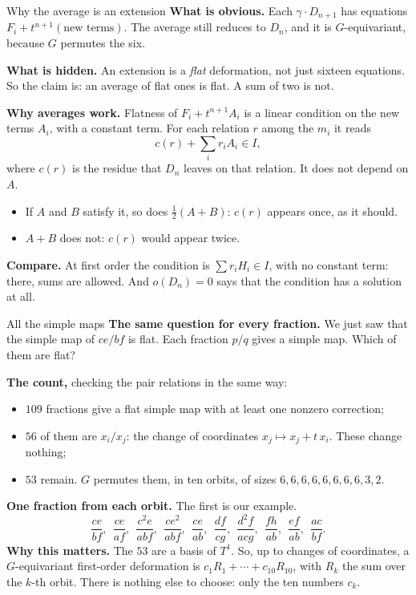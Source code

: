 \begin{frame}{Why the average is an extension}
\small
\textbf{What is obvious.} Each \(\gamma\cdot D_{n+1}\) has equations \(F_i+t^{n+1}(\text{new terms})\). The average still reduces to \(D_n\), and it is \(G\)-equivariant, because \(G\) permutes the six.
\par
\textbf{What is hidden.} An extension is a \emph{flat} deformation, not just sixteen equations. So the claim is: an average of flat ones is flat. A sum of two is not.
\par
\textbf{Why averages work.} Flatness of \(F_i+t^{n+1}A_i\) is a linear condition on the new terms \(A_i\), with a constant term. For each relation \(r\) among the \(m_i\) it reads
\[
\boxed{c(r)+\sum_i r_iA_i\in I,}
\]
where \(c(r)\) is the residue that \(D_n\) leaves on that relation. It does not depend on \(A\).
\begin{itemize}
\setlength{\itemsep}{1pt}
\item If \(A\) and \(B\) satisfy it, so does \(\frac12(A+B)\): \(c(r)\) appears once, as it should.
\item \(A+B\) does not: \(c(r)\) would appear twice.
\end{itemize}
\textbf{Compare.} At first order the condition is \(\sum r_iH_i\in I\), with no constant term: there, sums are allowed. And \(o(D_n)=0\) says that the condition has a solution at all.
\src{\textcolor{red}{The linear condition: derived for this slide, no source checked.}}
\end{frame}

\begin{frame}{All the simple maps}
\small
\textbf{The same question for every fraction.} We just saw that the simple map of \(ce/bf\) is flat. Each fraction \(p/q\) gives a simple map. Which of them are flat?
\par
\textbf{The count,} checking the pair relations in the same way:
\begin{itemize}
\setlength{\itemsep}{1pt}
\item \(109\) fractions give a flat simple map with at least one nonzero correction;
\item \(56\) of them are \(x_i/x_j\): the change of coordinates \(x_j\mapsto x_j+t\,x_i\). These change nothing;
\item \(53\) remain. \(G\) permutes them, in ten orbits, of sizes \(6,6,6,6,6,6,6,6,3,2\).
\end{itemize}
\textbf{One fraction from each orbit.} The first is our example.
\[
\frac{ce}{bf},\ \ \frac{ce}{af},\ \ \frac{c^2e}{abf},\ \ \frac{ce^2}{abf},\ \ \frac{ce}{ab},\ \ \frac{df}{cg},\ \ \frac{d^2f}{acg},\ \ \frac{fh}{ab},\ \ \frac{ef}{ab},\ \ \frac{ac}{bf}.
\]
\textbf{Why this matters.} The \(53\) are a basis of \(T^1\). So, up to changes of coordinates, a \(G\)-equivariant first-order deformation is \(c_1R_1+\cdots+c_{10}R_{10}\), with \(R_k\) the sum over the \(k\)-th orbit. There is nothing else to choose: only the ten numbers \(c_k\).
\end{frame}

